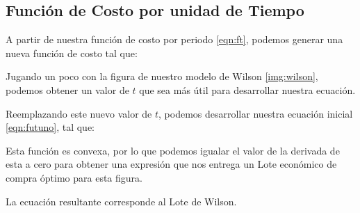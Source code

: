 \subsection{Función de Costo por unidad de Tiempo}
A partir de nuestra función de costo por periodo \ref{eqn:ft}, podemos generar una nueva función de costo tal que:


Jugando un poco con la figura de nuestro modelo de Wilson \ref{img:wilson}, podemos obtener un valor de $t$ que sea más útil para desarrollar nuestra ecuación.


Reemplazando este nuevo valor de $t$, podemos desarrollar nuestra ecuación inicial \ref{eqn:futuno}, tal que:


Esta función es convexa, por lo que podemos igualar el valor de la derivada de esta a cero para obtener una expresión que nos entrega un Lote económico de compra óptimo para esta figura.



La ecuación resultante corresponde al Lote de Wilson.

\clearpage
